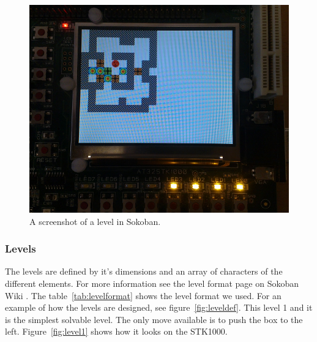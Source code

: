 \documentclass[a4paper,11pt]{article}
\begin{document}
\begin{figure}[H]
\centering
\includegraphics[scale=0.4]{images/sokobanscreen.png}
\caption{A screenshot of a level in Sokoban.}
\label{fig:sokobanscreen}
\end{figure}

\subsubsection{Levels}
The levels are defined by it's dimensions and an array of characters of the different elements. For more information see the level format page on Sokoban Wiki \cite{sokobanlevel}. The  table~\ref{tab:levelformat} shows the level format we used. For an example of how the levels are designed, see figure~\ref{fig:leveldef}. This level 1 and it is the simplest solvable level. The only move available is to push the box to the left. Figure~\ref{fig:level1} shows how it looks on the STK1000.
\end{document}
